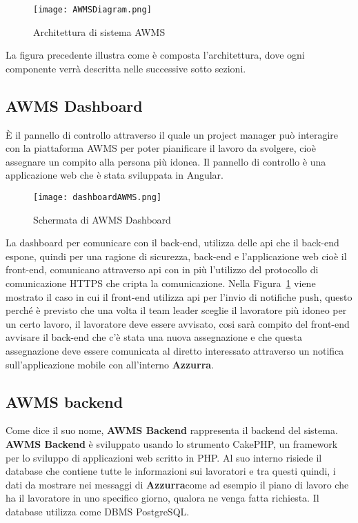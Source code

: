  \begin{figure}[h]
 	\begin{center}
 		\texttt{[image: AWMSDiagram.png]}
 		\caption{Architettura di sistema AWMS}\label{fig:arch}
 	\end{center}
 \end{figure}
La figura precedente illustra come è composta l'architettura, dove ogni componente verrà descritta nelle successive sotto sezioni.
\begin{trivlist}
	\item \subsection{AWMS Dashboard}
	È il pannello di controllo attraverso il quale un project manager può interagire con la piattaforma \gls{AWMS} per poter pianificare il lavoro da svolgere, cioè assegnare un compito alla persona più idonea. Il pannello di controllo è una applicazione web che è stata sviluppata in Angular.
	\begin{figure}[h] 
		\begin{center}
			\texttt{[image: dashboardAWMS.png]}
			\caption{Schermata di AWMS Dashboard}
		\end{center}
	\end{figure}
	 	La dashboard per comunicare con il back-end, utilizza delle \gls{api} che il back-end espone, quindi per una ragione di sicurezza, back-end e l'applicazione web cioè il front-end, comunicano attraverso \gls{api} con in più l'utilizzo del protocollo di comunicazione HTTPS che cripta la comunicazione. Nella Figura~\ref{fig:arch} viene mostrato il caso in cui il front-end utilizza \gls{api} per l'invio di notifiche push, questo perché è previsto che una volta il team leader sceglie il lavoratore più idoneo per un certo lavoro, il lavoratore deve essere avvisato, cosi sarà compito del front-end avvisare il back-end che c'è stata una nuova assegnazione e che questa assegnazione deve essere comunicata al diretto interessato attraverso un notifica sull'applicazione mobile con all'interno \textbf{Azzurra}.
	\item \subsection{AWMS backend}
	Come dice il suo nome, \textbf{AWMS Backend} rappresenta il backend del sistema. \textbf{AWMS Backend} è sviluppato usando lo strumento CakePHP, un framework per lo sviluppo di applicazioni web scritto in PHP. Al suo interno risiede il database che contiene tutte le informazioni sui lavoratori e tra questi quindi, i dati da mostrare nei messaggi di \textbf{Azzurra}come ad esempio il piano di lavoro che ha il lavoratore in uno specifico giorno, qualora ne venga fatta richiesta. Il database utilizza come DBMS PostgreSQL. \\

\end{trivlist}
